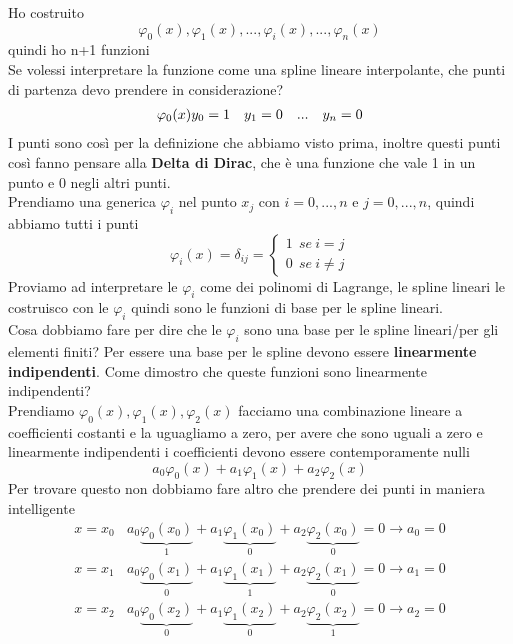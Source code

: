 \documentclass[a4paper, portrait]{book}
\numberwithin{equation}{chapter} %
\begin{document}
Ho costruito
\begin{equation}
    \varphi_0 (x), \varphi_1 (x),..., \varphi_i(x), ..., \varphi_n(x)
\end{equation}
quindi ho n+1 funzioni\\
Se volessi interpretare la funzione come una spline lineare interpolante, che punti di partenza devo prendere in considerazione?\\
\begin{equation}
    \varphi_0(x)\\
    \begin{matrix}
        y_0 = 1&y_1 = 0&...&y_n=0
    \end{matrix}
\end{equation}
I punti sono così per la definizione che abbiamo visto prima, inoltre questi punti così fanno pensare alla \textbf{Delta di Dirac}, che è una funzione che vale 1 in un punto e 0 negli altri punti.\\
Prendiamo una generica $\varphi_i$ nel punto $x_j$ con $i = 0,...,n$ e $j = 0,...,n$, quindi abbiamo tutti i punti
\begin{equation}
    \varphi_i(x) = \delta_{ij} = \begin{cases}
        1 \ \ se \ i=j\\
        0 \ \ se \ i\neq j 
    \end{cases}
\end{equation}
Proviamo ad interpretare le $\varphi_i$ come dei polinomi di Lagrange, le spline lineari le costruisco con le $\varphi_i$ quindi sono le funzioni di base per le spline lineari.\\
Cosa dobbiamo fare per dire che le $\varphi_i$ sono una base per le spline lineari/per gli elementi finiti? Per essere una base per le spline devono essere \textbf{linearmente indipendenti}. Come dimostro che queste funzioni sono linearmente indipendenti?\\
Prendiamo $\varphi_0(x), \varphi_1(x), \varphi_2(x)$ facciamo una combinazione lineare a coefficienti costanti e la uguagliamo a zero, per avere che sono uguali a zero e linearmente indipendenti i coefficienti devono essere contemporamente nulli
\begin{equation}
    a_0 \varphi_0(x) + a_1 \varphi_1(x) + a_2 \varphi_2(x)
\end{equation}
Per trovare questo non dobbiamo fare altro che prendere dei punti in maniera intelligente
\begin{gather}
    x = x_0 \ \ \ \ a_0\underbrace{\varphi_0(x_0)}_{1} + a_1 \underbrace{\varphi_1(x_0)}_{0} + a_2 \underbrace{\varphi_2(x_0)}_{0} = 0 \rightarrow a_0 = 0\\
    x = x_1 \ \ \ \ a_0\underbrace{\varphi_0(x_1)}_{0} + a_1 \underbrace{\varphi_1(x_1)}_{1} + a_2 \underbrace{\varphi_2(x_1)}_{0} = 0 \rightarrow a_1 = 0\\
    x = x_2 \ \ \ \ a_0\underbrace{\varphi_0(x_2)}_{0} + a_1\underbrace{\varphi_1(x_2)}_{0} + a_2\underbrace{\varphi_2(x_2)}_{1} = 0 \rightarrow a_2 = 0
\end{gather}
\end{document}
